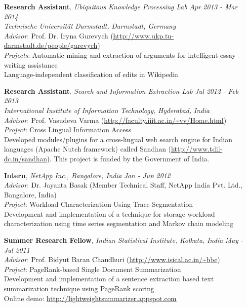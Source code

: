 \documentclass[11pt]{article}
\newenvironment{changemargin}[2]{%
  \begin{list}{}{%
    \setlength{\topsep}{0pt}%
    \setlength{\leftmargin}{#1}%
    \setlength{\rightmargin}{#2}%
    \setlength{\listparindent}{\parindent}%
    \setlength{\itemindent}{\parindent}%
    \setlength{\parsep}{\parskip}%
  }%
  \item[]}{\end{list}
}
\newenvironment{body} {
	\vspace*{-16pt}
	\begin{changemargin}{-0.25in}{-0.5in}
  }	
	{\end{changemargin}
}
\begin{document}
\begin{body}
	\vspace{14pt}
	\textbf{Research Assistant}, \emph{Ubiquitous Knowledge Processing Lab} \hfill \emph{Apr 2013 - Mar 2014} \\
	\emph{Technische Universität Darmstadt, Darmstadt, Germany} \\
	\emph{Advisor}: Prof. Dr. Iryna Gurevych (\url{http://www.ukp.tu-darmstadt.de/people/gurevych}) \\
	\emph{Projects}: Automatic mining and extraction of arguments for intelligent essay writing assistance \\ 
	\hspace{42pt} Language-independent classification of edits in Wikipedia \\
	
	\medskip
	
	\textbf {Research Assistant}, \emph{Search and Information Extraction Lab} \hfill \emph{Jul 2012 - Feb 2013} \\
	\emph{International Institute of Information Technology, Hyderabad, India} \\
	\emph{Advisor}: Prof. Vasudeva Varma (\url{http://faculty.iiit.ac.in/~vv/Home.html}) \\
	\emph{Project}: Cross Lingual Information Access \\
	Developed modules/plugins for a cross-lingual web search engine for Indian languages (Apache Nutch framework) called Sandhan (\url{http://www.tdil-dc.in/sandhan}).
	This project is funded by the Government of India.
	
	\medskip
	
	\textbf {Intern}, \emph{NetApp Inc., Bangalore, India} \hfill \emph{Jan - Jun 2012} \\
	\emph{Advisor}: Dr. Jayanta Basak (Member Technical Staff, NetApp India Pvt. Ltd., Bangalore, India) \\
	\emph{Project}: Workload Characterization Using Trace Segmentation \\
	Development and implementation of a technique for storage workload characterization using time series segmentation and Markov chain modeling \\
	
	\medskip
	
	\textbf {Summer Research Fellow}, \emph{Indian Statistical Institute, Kolkata, India} \hfill \emph{May - Jul 2011} \\
	\emph{Advisor}: Prof. Bidyut Baran Chaudhuri (\url{http://www.isical.ac.in/~bbc}) \\
	\emph{Project}: PageRank-based Single Document Summarization \\
	Development and implementation of a sentence extraction based text summarization technique using PageRank scoring \\
	Online demo: \url{http://lightweightsummarizer.appspot.com}

\end{body}
\end{document}
